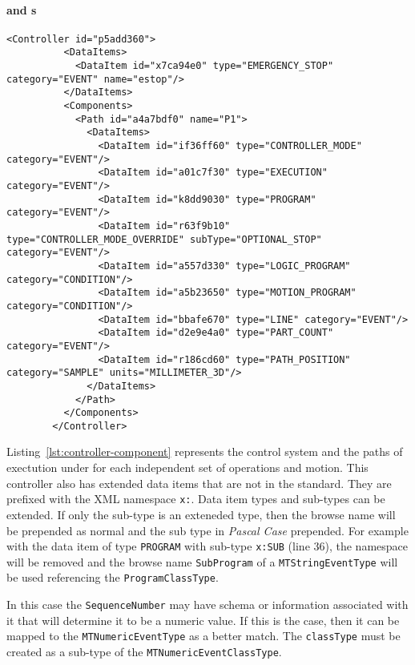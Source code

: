 \FloatBarrier

\paragraph{ and  s}

\begin{lstlisting}[firstnumber=last,%
    caption={Controller and Path Components and Their Data Items},label={lst:controller-component}]
        <Controller id="p5add360">
          <DataItems>
            <DataItem id="x7ca94e0" type="EMERGENCY_STOP" category="EVENT" name="estop"/>
          </DataItems>
          <Components>
            <Path id="a4a7bdf0" name="P1">
              <DataItems>
                <DataItem id="if36ff60" type="CONTROLLER_MODE" category="EVENT"/>
                <DataItem id="a01c7f30" type="EXECUTION" category="EVENT"/>
                <DataItem id="k8dd9030" type="PROGRAM" category="EVENT"/>
                <DataItem id="r63f9b10" type="CONTROLLER_MODE_OVERRIDE" subType="OPTIONAL_STOP" category="EVENT"/>
                <DataItem id="a557d330" type="LOGIC_PROGRAM" category="CONDITION"/>
                <DataItem id="a5b23650" type="MOTION_PROGRAM" category="CONDITION"/>
                <DataItem id="bbafe670" type="LINE" category="EVENT"/>
                <DataItem id="d2e9e4a0" type="PART_COUNT" category="EVENT"/>
                <DataItem id="r186cd60" type="PATH_POSITION" category="SAMPLE" units="MILLIMETER_3D"/>
              </DataItems>
            </Path>
          </Components>
        </Controller>
\end{lstlisting}

Listing~\ref{lst:controller-component} represents the control system and the paths of exectution under for each independent set of operations and motion. This controller also has extended data items that are not in the standard. They are prefixed with the XML namespace \texttt{x:}. Data item types and sub-types can be extended. If only the sub-type is an exteneded type, then the browse name will be prepended as normal and the sub type in \textit{Pascal Case} prepended. For example with the data item of type \texttt{PROGRAM} with sub-type \texttt{x:SUB} (line 36), the namespace will be removed and the browse name \texttt{SubProgram} of a \texttt{MTStringEventType} will be used referencing the \texttt{ProgramClassType}. 

In this case the \texttt{SequenceNumber} may have schema or information associated with it that will determine it to be a numeric value. If this is the case, then it can be mapped to the \texttt{MTNumericEventType} as a better match. The \texttt{classType} must be created as a sub-type of the \texttt{MTNumericEventClassType}.


